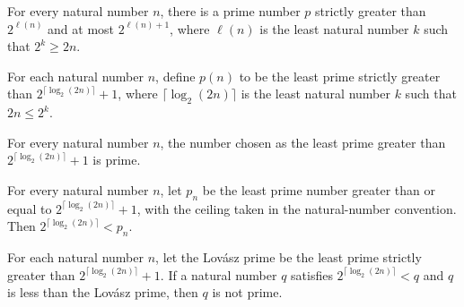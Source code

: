 \begin{theorem}
\label{Complexity.BinArith.exists_prime_lovaszBits}
\leanok
{}
For every natural number $n$, there is a prime number $p$ strictly greater than
$2^{\ell(n)}$ and at most $2^{\ell(n)+1}$, where $\ell(n)$ is the least natural number
$k$ such that $2^k\ge 2n$.
\end{theorem}

\begin{definition}
\label{Complexity.BinArith.lovaszPrime}
\leanok
For each natural number $n$, define $p(n)$ to be the least prime strictly greater than
$2^{\lceil\log_2(2n)\rceil}+1$, where $\lceil\log_2(2n)\rceil$ is the least natural
number $k$ such that $2n \le 2^k$.
\end{definition}

\begin{theorem}
\label{Complexity.BinArith.lovaszPrime_prime}
\leanok
{}
For every natural number $n$, the number chosen as the least prime greater than
$2^{\lceil\log_2(2n)\rceil}+1$ is prime.
\end{theorem}

\begin{theorem}
\label{Complexity.BinArith.two_pow_lt_lovaszPrime}
\leanok
{}
For every natural number $n$, let $p_n$ be the least prime number greater than or equal
to $2^{\lceil\log_2(2n)\rceil}+1$, with the ceiling taken in the natural-number
convention. Then $2^{\lceil\log_2(2n)\rceil} < p_n$.
\end{theorem}

\begin{theorem}
\label{Complexity.BinArith.not_prime_of_lt_lovaszPrime}
\leanok
{}
For each natural number $n$, let the Lovász prime be the least prime strictly greater
than $2^{\lceil\log_2(2n)\rceil}+1$. If a natural number $q$ satisfies
$2^{\lceil\log_2(2n)\rceil}<q$ and $q$ is less than the Lovász prime, then $q$ is not
prime.
\end{theorem}

